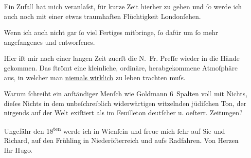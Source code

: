 \pstart
           Ein Zufall hat mich veranlaſst, für kurze Zeit hierher zu gehen und{ }ſo werde ich auch
               noch mit einer etwas traumhaften {\pb}Flüchtigkeit Londonſehen.\pend
           
\pstart
           Wenn ich auch nicht gar{ }ſo viel Fertiges mitbringe,{ }ſo dafür um{ }ſo mehr angefangenes
               und entworfenes.\pend
           
\pstart
           Hier iſt mir nach einer langen Zeit zuerſt die N. Fr.
                  Preſſe wieder in die Hände gekommen. Das{ }ſtrömt eine kleinliche, ordinäre,
               herabgekommene Atmoſphäre {\pb}aus, in
               welcher man \uline{niemals wirklich} zu leben trachten
               muſs.\pend
           
\pstart
           Warum ſchreibt ein anſtändiger
               Menſch wie Goldmann 6 Spalten voll mit Nichts,
               dieſes Nichts in dem unbeſchreiblich widerwärtigen witzelnden jüdiſchen Ton, der
               nirgends auf der Welt exiſtiert als im Feuilleton deutſcher u. oeſterr. Zeitungen?\pend
           
\pstart
           {\pb}Ungefähr den 18\textsuperscript{ten} werde ich in Wienſein und freue mich{ }ſehr auf Sie und Richard, auf den Frühling in Niederöſterreich und aufs Radfahren.\pend
           \pstart Von Herzen Ihr \spacefill\mbox{Hugo.}\pend{}\endnumbering{}  \newcommand{\dateiname}{L01035}\newcommand{\titel}{Hugo von Hofmannsthal an Arthur Schnitzler, 6. 5. [1900]}\newcommand{\editorInnen}{Martin Anton Müller und Gerd-Hermann Susen}

